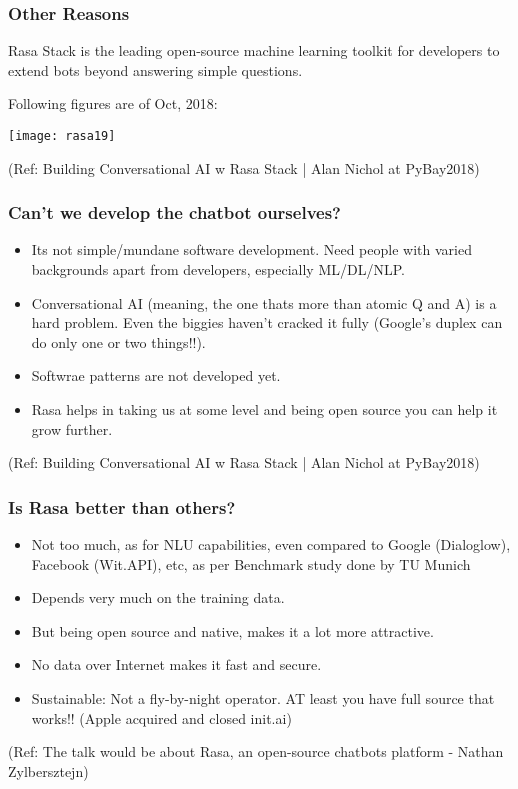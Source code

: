  \begin{frame}[fragile]\frametitle{Other Reasons}

Rasa Stack is the leading open-source machine learning toolkit for developers to extend bots beyond answering simple questions.

Following figures are of Oct, 2018:

\begin{center}
\texttt{[image: rasa19]}
\end{center}


{\tiny (Ref: Building Conversational AI w Rasa Stack | Alan Nichol at PyBay2018)}

\end{frame}


 \begin{frame}[fragile]\frametitle{Can't we develop the chatbot ourselves?}

\begin{itemize}
\item Its not simple/mundane software development. Need people with varied backgrounds apart from developers, especially ML/DL/NLP.
\item Conversational AI (meaning, the one thats more than atomic Q and A) is a hard problem. Even the biggies haven't cracked it fully (Google's duplex can do only one or two things!!).
\item Softwrae patterns are not developed yet.
\item Rasa helps in taking us at some level and being open source you can help it grow further.
\end{itemize}


{\tiny (Ref: Building Conversational AI w Rasa Stack | Alan Nichol at PyBay2018)}

\end{frame}

 \begin{frame}[fragile]\frametitle{Is Rasa better than others?}
\begin{itemize}
\item Not too much, as for NLU capabilities, even compared to Google (Dialoglow), Facebook (Wit.API), etc, as per Benchmark study done by TU Munich
\item Depends very much on the training data.
\item But being open source and native, makes it a lot more attractive.
\item No data over Internet makes it fast and secure.
\item Sustainable: Not a fly-by-night operator. AT least you have full source that works!! (Apple acquired and closed init.ai)
\end{itemize}

{\tiny (Ref: The talk would be about Rasa, an open-source chatbots platform - Nathan Zylbersztejn)}

\end{frame}

